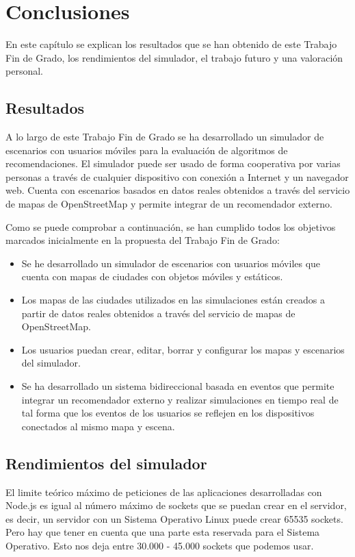 \chapter{Conclusiones}

En este capítulo se explican los resultados que se han obtenido de este Trabajo Fin de Grado, los rendimientos del simulador, el trabajo futuro y una valoración personal.

\section{Resultados}

A lo largo de este Trabajo Fin de Grado se ha desarrollado un simulador de escenarios con usuarios móviles para la evaluación de algoritmos de recomendaciones. El simulador puede ser usado de forma cooperativa por varias personas a través de cualquier dispositivo con conexión a Internet y un navegador web. Cuenta con escenarios basados en datos reales obtenidos a través del servicio de mapas de OpenStreetMap y permite integrar de un recomendador externo.

Como se puede comprobar a continuación, se han cumplido todos los objetivos marcados inicialmente en la propuesta del Trabajo Fin de Grado:
\begin{itemize}
	\item Se he desarrollado un simulador de escenarios con usuarios móviles que cuenta con mapas de ciudades con objetos móviles y estáticos.
	\item Los mapas de las ciudades utilizados en las simulaciones están creados a partir de datos reales obtenidos a través del servicio de mapas de OpenStreetMap.
	\item Los usuarios puedan crear, editar, borrar y configurar los mapas y escenarios del simulador.
	\item Se ha desarrollado un sistema bidireccional basada en eventos que permite integrar un recomendador externo y realizar simulaciones en tiempo real de tal forma que los eventos de los usuarios se reflejen en los dispositivos conectados al mismo mapa y escena.
\end{itemize}

\section{Rendimientos del simulador}

El limite teórico máximo de peticiones de las aplicaciones desarrolladas con Node.js es igual al número máximo de sockets que se puedan crear en el servidor, es decir, un servidor con un Sistema Operativo Linux puede crear 65535 sockets. Pero hay que tener en cuenta que una parte esta reservada para el Sistema Operativo. Esto nos deja entre 30.000 - 45.000 sockets que podemos usar.

